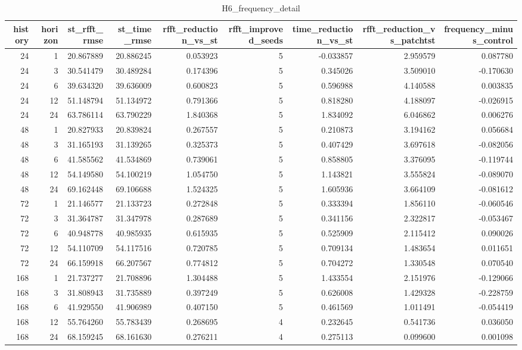 \begin{table}
\caption{H6_frequency_detail}
\label{tab:H6_frequency_detail}
\begin{tabular}{rrrrrrrrr}
\toprule
history & horizon & st\_rfft\_rmse & st\_time\_rmse & rfft\_reduction\_vs\_st & rfft\_improved\_seeds & time\_reduction\_vs\_st & rfft\_reduction\_vs\_patchtst & frequency\_minus\_control \\
\midrule
24 & 1 & 20.867889 & 20.886245 & 0.053923 & 5 & -0.033857 & 2.959579 & 0.087780 \\
24 & 3 & 30.541479 & 30.489284 & 0.174396 & 5 & 0.345026 & 3.509010 & -0.170630 \\
24 & 6 & 39.634320 & 39.636009 & 0.600823 & 5 & 0.596988 & 4.140588 & 0.003835 \\
24 & 12 & 51.148794 & 51.134972 & 0.791366 & 5 & 0.818280 & 4.188097 & -0.026915 \\
24 & 24 & 63.786114 & 63.790229 & 1.840368 & 5 & 1.834092 & 6.046862 & 0.006276 \\
48 & 1 & 20.827933 & 20.839824 & 0.267557 & 5 & 0.210873 & 3.194162 & 0.056684 \\
48 & 3 & 31.165193 & 31.139265 & 0.325373 & 5 & 0.407429 & 3.697618 & -0.082056 \\
48 & 6 & 41.585562 & 41.534869 & 0.739061 & 5 & 0.858805 & 3.376095 & -0.119744 \\
48 & 12 & 54.149580 & 54.100219 & 1.054750 & 5 & 1.143821 & 3.555824 & -0.089070 \\
48 & 24 & 69.162448 & 69.106688 & 1.524325 & 5 & 1.605936 & 3.664109 & -0.081612 \\
72 & 1 & 21.146577 & 21.133723 & 0.272848 & 5 & 0.333394 & 1.856110 & -0.060546 \\
72 & 3 & 31.364787 & 31.347978 & 0.287689 & 5 & 0.341156 & 2.322817 & -0.053467 \\
72 & 6 & 40.948778 & 40.985935 & 0.615935 & 5 & 0.525909 & 2.115412 & 0.090026 \\
72 & 12 & 54.110709 & 54.117516 & 0.720785 & 5 & 0.709134 & 1.483654 & 0.011651 \\
72 & 24 & 66.159918 & 66.207567 & 0.774812 & 5 & 0.704272 & 1.330548 & 0.070540 \\
168 & 1 & 21.737277 & 21.708896 & 1.304488 & 5 & 1.433554 & 2.151976 & -0.129066 \\
168 & 3 & 31.808943 & 31.735889 & 0.397249 & 5 & 0.626008 & 1.429328 & -0.228759 \\
168 & 6 & 41.929550 & 41.906989 & 0.407150 & 5 & 0.461569 & 1.011491 & -0.054419 \\
168 & 12 & 55.764260 & 55.783439 & 0.268695 & 4 & 0.232645 & 0.541736 & 0.036050 \\
168 & 24 & 68.159245 & 68.161630 & 0.276211 & 4 & 0.275113 & 0.099600 & 0.001098 \\
\bottomrule
\end{tabular}
\end{table}
